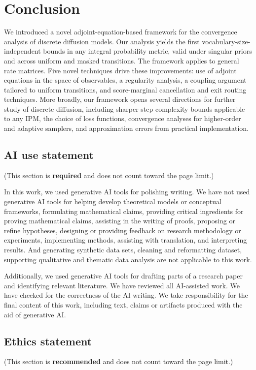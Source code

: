\documentclass{article} %
\begin{document}
\section{Conclusion}
We introduced a novel adjoint-equation-based framework for the convergence analysis of discrete diffusion models. Our analysis yields the first vocabulary-size-independent bounds in any integral probability metric, valid under
singular priors and across uniform and masked transitions.
The framework applies to general rate matrices. Five novel techniques drive these improvements: use of adjoint equations in the space of observables, a regularity analysis, a coupling argument tailored to uniform transitions, and score-marginal cancellation and exit routing techniques. 
More broadly, our framework opens several directions for further study of discrete diffusion, including sharper step complexity bounds applicable to any IPM, the choice of loss functions, convergence analyses for higher-order and adaptive samplers, and approximation errors from practical implementation.


\subsection*{AI use statement}
(This section is \textbf{required} and does not count toward the page limit.)

In this work, we used generative AI tools for polishing writing.
We have not used generative AI tools for helping develop theoretical models or conceptual frameworks, formulating mathematical claims, providing critical ingredients for proving mathematical claims, assisting in the writing of proofs, proposing or refine hypotheses, designing or providing feedback on research  methodology or experiments, implementing methods, assisting with translation, and interpreting results. And generating synthetic data sets,  cleaning and reformatting dataset, supporting qualitative and thematic data analysis are not applicable to this work.

Additionally, we used generative AI tools for drafting parts of a research paper and identifying relevant literature. We have reviewed all AI-assisted work. We have checked for the correctness of the AI writing. We take responsibility for the final content of this work,
including text, claims or artifacts produced with the aid of generative AI.


\subsection*{Ethics statement}
(This section is \textbf{recommended} and does not count toward the page limit.)
\end{document}
